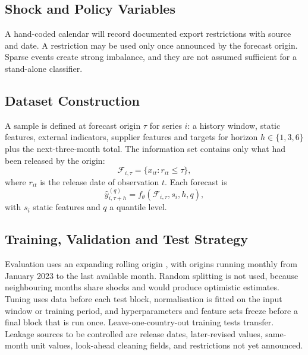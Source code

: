 \documentclass[conference]{IEEEtran}
\begin{document}
\subsection{Shock and Policy Variables}
A hand-coded calendar will record documented export restrictions with source and date. A restriction may be used only once announced by the forecast origin. Sparse events create strong imbalance, and they are not assumed sufficient for a stand-alone classifier.

\subsection{Dataset Construction}
A sample is defined at forecast origin $\tau$ for series $i$: a history window, static features, external indicators, supplier features and targets for horizon $h\in\{1,3,6\}$ plus the next-three-month total. The information set contains only what had been released by the origin:
\begin{equation}
\mathcal{F}_{i,\tau}=\{x_{it}: r_{it}\leq\tau\},
\label{eq:asof}
\end{equation}
where $r_{it}$ is the release date of observation $t$. Each forecast is
\begin{equation}
\hat{y}^{(q)}_{i,\tau+h}=f_{\theta}\!\left(\mathcal{F}_{i,\tau}, s_{i}, h, q\right),
\label{eq:forecast}
\end{equation}
with $s_i$ static features and $q$ a quantile level.

\subsection{Training, Validation and Test Strategy}\label{sec:split}
Evaluation uses an expanding rolling origin \cite{tashman2000}, with origins running monthly from January 2023 to the last available month. Random splitting is not used, because neighbouring months share shocks and would produce optimistic estimates. Tuning uses data before each test block, normalisation is fitted on the input window or training period, and hyperparameters and feature sets freeze before a final block that is run once. Leave-one-country-out training tests transfer. Leakage sources to be controlled are release dates, later-revised values, same-month unit values, look-ahead cleaning fields, and restrictions not yet announced.
\end{document}
